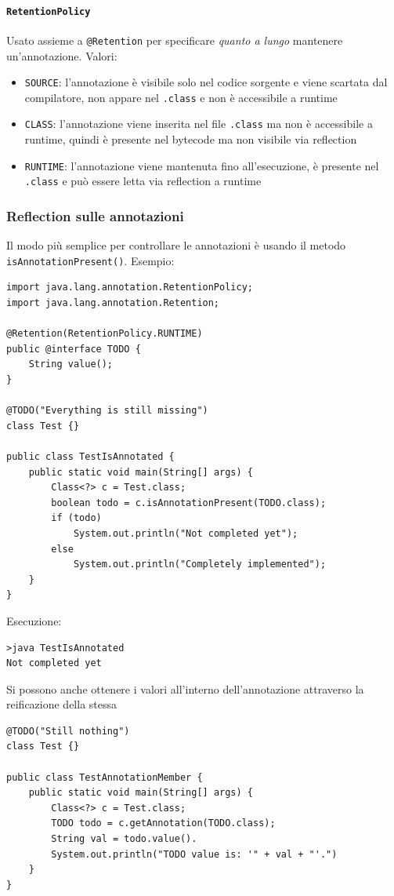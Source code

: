 \paragraph{\texttt{RetentionPolicy}} Usato assieme a \texttt{@Retention} per specificare \textit{quanto a lungo} mantenere un'annotazione. Valori:
\begin{itemize}
    \item \texttt{SOURCE}: l'annotazione è visibile solo nel codice sorgente e viene scartata dal compilatore, non appare nel \texttt{.class} e non è accessibile a runtime

    \item \texttt{CLASS}: l'annotazione viene inserita nel file \texttt{.class} ma non è accessibile a runtime, quindi è presente nel bytecode ma non visibile via reflection

    \item \texttt{RUNTIME}: l'annotazione viene mantenuta fino all'esecuzione, è presente nel \texttt{.class} e può essere letta via reflection a runtime
\end{itemize}

\subsubsection{Reflection sulle annotazioni}

Il modo più semplice per controllare le annotazioni è usando il metodo \texttt{isAnnotationPresent()}. Esempio:
\begin{verbatim}
import java.lang.annotation.RetentionPolicy;
import java.lang.annotation.Retention;

@Retention(RetentionPolicy.RUNTIME)
public @interface TODO {
    String value();
}

@TODO("Everything is still missing")
class Test {}

public class TestIsAnnotated {
    public static void main(String[] args) {
        Class<?> c = Test.class;
        boolean todo = c.isAnnotationPresent(TODO.class);
        if (todo)
            System.out.println("Not completed yet");
        else
            System.out.println("Completely implemented");
    }
}
\end{verbatim}

Esecuzione:
\begin{verbatim}
>java TestIsAnnotated
Not completed yet
\end{verbatim}

Si possono anche ottenere i valori all'interno dell'annotazione attraverso la reificazione della stessa
\begin{verbatim}
@TODO("Still nothing")
class Test {}

public class TestAnnotationMember {
    public static void main(String[] args) {
        Class<?> c = Test.class;
        TODO todo = c.getAnnotation(TODO.class);
        String val = todo.value().
        System.out.println("TODO value is: '" + val + "'.")
    }
}
\end{verbatim}

